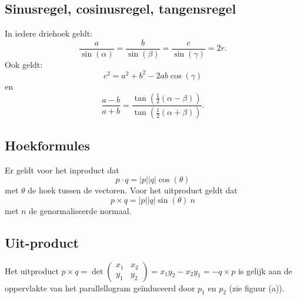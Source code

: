 \documentclass[10pt,a4paper,titlepage]{article}
\begin{document}
\subsection{Sinusregel, cosinusregel, tangensregel}
In iedere driehoek geldt:
\[ \frac{a}{\sin(\alpha)} = \frac{b}{\sin(\beta)} = \frac{c}{\sin(\gamma)} = 2r. \]
Ook geldt:
\[ c^2 = a^2 + b^2 - 2ab\cos(\gamma) \]
en
\[ \frac{a - b}{a + b} = \frac{\tan(\frac{1}{2}(\alpha - \beta))}{\tan(\frac{1}{2}(\alpha + \beta))}. \]

\subsection{Hoekformules}

Er geldt voor het inproduct dat 
\[
p \cdot q  = |p||q|\cos(\theta)
\]
met $\theta$ de hoek tussen de vectoren. Voor het uitproduct geldt dat
\[
p \times q = |p||q| \sin(\theta) \ n
\]
met $n$ de genormaliseerde normaal.


\subsection{Uit-product}

Het uitproduct $p\times q = \det\left(\begin{smallmatrix}x_1 & x_2\\y_1 & y_2\end{smallmatrix}\right) = x_1y_2 - x_2y_1 = -q\times p$ is gelijk aan de oppervlakte van het parallellogram ge\"induceerd door $p_1$ en $p_2$ (zie figuur (a)).

\smallskip
\end{document}
